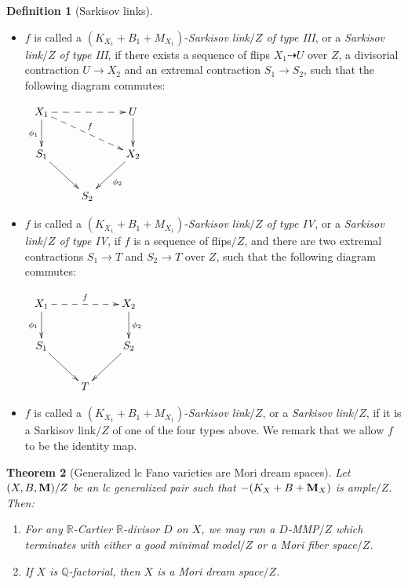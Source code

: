 \documentclass[11pt]{amsart}
\numberwithin{equation}{section}
\newcommand{\Mm}{{\bf{M}}}
\newcommand{\Qq}{\mathbb{Q}}
\newcommand{\Rr}{\mathbb{R}}
\newtheorem{thm}{Theorem}[section]
\theoremstyle{definition}
\newtheorem{defn}[thm]{Definition}
\theoremstyle{definition}
\theoremstyle{definition}
\begin{document}
\begin{defn}[Sarkisov links]
\begin{itemize}
\item $f$ is called a $(K_{X_1}+B_1+M_{X_1})$-\emph{Sarkisov link$/Z$ of type III}, or a \emph{Sarkisov link$/Z$ of type III}, if there exists a sequence of flips $X_1\dashrightarrow U$ over $Z$, a divisorial contraction $U\rightarrow X_2$ and an extremal contraction $S_1\rightarrow S_2$, such that the following diagram commutes:
\begin{center}$\xymatrix{
 X_1\ar@{->}[d]_{\phi_1}\ar@{-->}[drr]^{f}\ar@{-->}[rr]& &U\ar@{->}[d] \\
      S_1\ar@{->}[dr]   &  & X_2\ar@{->}[dl]^{\phi_2} \\
    & S_2 &}$
\end{center}

\item $f$ is called a $(K_{X_1}+B_1+M_{X_1})$-\emph{Sarkisov link$/Z$ of type IV}, or a \emph{Sarkisov link$/Z$ of type IV}, if $f$ is a sequence of flips$/Z$, and there are two extremal contractions $S_1\rightarrow T$ and $S_2\rightarrow T$ over $Z$, such that the following diagram commutes:
\begin{center}$\xymatrix{
 X_1\ar@{-->}[rr]^{f}\ar@{->}[d]_{\phi_1}& &X_2\ar@{->}[d]^{\phi_2} \\
      S_1\ar@{->}[dr]   &  & S_2\ar@{->}[dl] \\
    & T&}$
\end{center}
\item $f$ is called a  $(K_{X_1}+B_1+M_{X_1})$-\emph{Sarkisov link}$/Z$, or a \emph{Sarkisov link}$/Z$, if it is a Sarkisov link$/Z$ of one of the four types above. We remark that we allow $f$ to be the identity map.
\end{itemize}
\end{defn}
\begin{thm}[Generalized lc Fano varieties are Mori dream spaces]
    Let $(X,B,\Mm)/Z$ be an lc generalized pair such that $-(K_X+B+\Mm_X)$ is ample$/Z$. Then:
    \begin{enumerate}
        \item For any $\Rr$-Cartier $\Rr$-divisor $D$ on $X$, we may run a $D$-MMP$/Z$ which terminates with either a good minimal model$/Z$ or a Mori fiber space$/Z$.
        \item If $X$ is $\Qq$-factorial, then $X$ is a Mori dream space$/Z$.
    \end{enumerate}
\end{thm}
\end{document}
